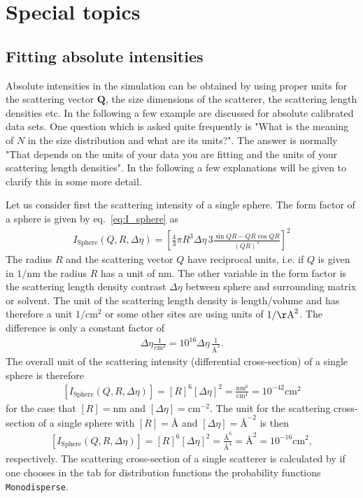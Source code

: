 \chapter{Special topics}
\label{ch:special}

\section{Fitting absolute intensities}

Absolute intensities in the simulation can be obtained by using
proper units for the scattering vector $\mathbf{Q}$, the size
dimensions of the scatterer, the scattering length densities etc. In
the following a few example are discussed for absolute calibrated
data sets. One question which is asked quite frequently is "What is
the meaning of $N$ in the size distribution and what are its units?".
The answer is normally "That depends on the units of your data you
are fitting and the units of your scattering length densities". In
the following a few explanations will be given to clarify this in
some more detail.

Let us consider first the scattering intensity of a single sphere.
The form factor of a sphere is given by eq.\ \ref{eq:I_sphere} as
\begin{align}
I_\text{Sphere}(Q,R,\Delta\eta) =  \left[\frac{4}{3}\pi R^3 \Delta\eta \, 3
\frac{\sin QR - QR \cos QR}{(QR)^3} \right]^2
\end{align}
The radius $R$ and the scattering vector $Q$ have reciprocal units,
i.e. if $Q$ is given in $1/\mathrm{nm}$ the radius $R$ has a unit of
nm. The other variable in the form factor is the scattering length
density contrast $\Delta\eta$ between sphere and surrounding matrix
or solvent. The unit of the scattering length density is
length/volume and has therefore a unit $1/\mathrm{cm}^2$ or some
other sites are using units of $1/\mathrm{{\AA}}^2$. The difference is only a
constant factor of
\begin{align}
\Delta\eta \frac{1}{\textrm{cm}^2}=
10^{16} \Delta\eta\, \frac{1}{\textrm{\AA}^2}.
\end{align}
The overall unit of the scattering intensity (differential cross-section)
of a single sphere is therefore
\begin{align}
\left[ I_\text{Sphere}(Q,R,\Delta\eta) \right] =
\left[R\right]^6 \left[\Delta\eta\right]^2 =
\frac{\textrm{nm}^6}{\textrm{cm}^4} =
10^{-42} \textrm{cm}^2
\end{align}
for the case that $[R]=\textrm{nm}$ and
$[\Delta\eta]=\textrm{cm}^{-2}$. The unit for the scattering
cross-section of a single sphere with $[R]=\textrm{\AA}$ and
$[\Delta\eta]=\textrm{\AA}^{-2}$ is then
\begin{align}
\left[ I_\text{Sphere}(Q,R,\Delta\eta) \right] =
\left[R\right]^6 \left[\Delta\eta\right]^2 =
\frac{\textrm{\AA}^6}{\textrm{\AA}^4} = \textrm{\AA}^2 =
10^{-16} \textrm{cm}^2,
\end{align}
respectively. The scattering cross-section of a single scatterer is calculated by
\SASfit if one chooses in the tab for distribution functions the probability
functions \texttt{Monodisperse}.


